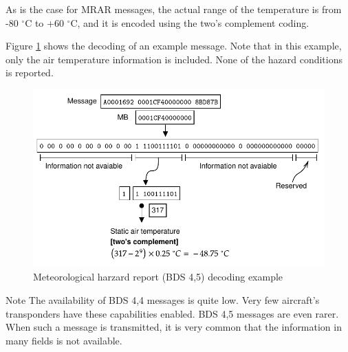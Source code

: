 As is the case for MRAR messages, the actual range of the temperature is from -80 $^\circ$C to +60 $^\circ$C, and it is encoded using the two's complement coding.

Figure \ref{fig:bds45_example} shows the decoding of an example message. Note that in this example, only the air temperature information is included. None of the hazard conditions is reported.

\begin{figure}[ht]
  \centering
  \includegraphics[scale=0.9]{figures/mode_s/bds45_example.pdf}
  \caption{Meteorological harzard report (BDS 4,5) decoding example}
  \label{fig:bds45_example}
\end{figure}


\begin{notebox}{Note}
The availability of BDS 4,4 messages is quite low. Very few aircraft's transponders have these capabilities enabled. BDS 4,5 messages are even rarer. When such a message is transmitted, it is very common that the information in many fields is not available.
\end{notebox}

